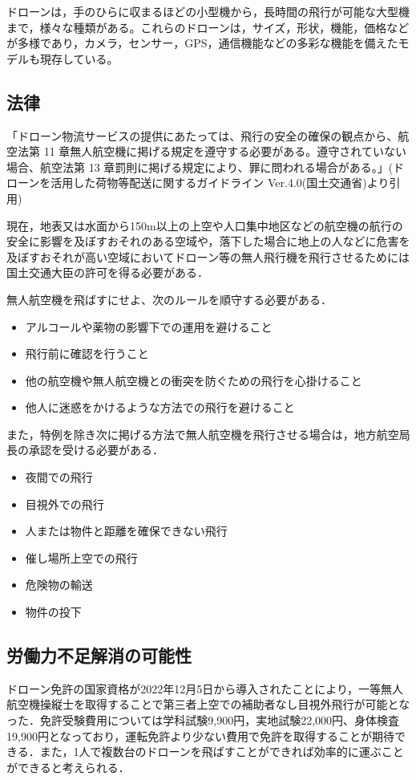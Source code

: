 \documentclass[a4paper, titlepage]{jsarticle}
\begin{document}
ドローンは，手のひらに収まるほどの小型機から，長時間の飛行が可能な大型機まで，様々な種類がある。これらのドローンは，サイズ，形状，機能，価格などが多様であり，カメラ，センサー，GPS，通信機能などの多彩な機能を備えたモデルも現存している。

\subsection{法律}
「ドローン物流サービスの提供にあたっては、飛行の安全の確保の観点から、航空法第 11 章無人航空機に掲げる規定を遵守する必要がある。遵守されていない場合、航空法第 13 章罰則に掲げる規定により、罪に問われる場合がある。」(ドローンを活用した荷物等配送に関するガイドライン Ver.4.0(国土交通省)\cite{delivery_guidelines_2023}より引用)

現在，地表又は水面から150m以上の上空や人口集中地区などの航空機の航行の安全に影響を及ぼすおそれのある空域や，落下した場合に地上の人などに危害を及ぼすおそれが高い空域においてドローン等の無人飛行機を飛行させるためには国土交通大臣の許可を得る必要がある．

無人航空機を飛ばすにせよ、次のルールを順守する必要がある．\cite{prohibited_guidelines}
\begin{itemize}
\item アルコールや薬物の影響下での運用を避けること
\item 飛行前に確認を行うこと
\item 他の航空機や無人航空機との衝突を防ぐための飛行を心掛けること
\item 他人に迷惑をかけるような方法での飛行を避けること
\end{itemize}
また，特例を除き次に掲げる方法で無人航空機を飛行させる場合は，地方航空局長の承認を受ける必要がある．
\begin{itemize}
\item 夜間での飛行
\item 目視外での飛行
\item 人または物件と距離を確保できない飛行
\item 催し場所上空での飛行
\item 危険物の輸送
\item 物件の投下
\end{itemize}

\subsection{労働力不足解消の可能性}
ドローン免許の国家資格が2022年12月5日から導入されたことにより，一等無人航空機操縦士を取得することで第三者上空での補助者なし目視外飛行が可能となった．免許受験費用については学科試験9,900円，実地試験22,000円、身体検査19,900円となっており，運転免許より少ない費用で免許を取得することが期待できる．また，1人で複数台のドローンを飛ばすことができれば効率的に運ぶことができると考えられる．
\end{document}
